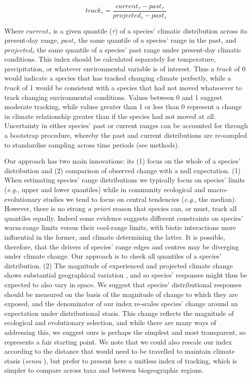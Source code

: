 \documentclass[12pt]{report}
\begin{document}
\begin{equation}
  track_\tau = \frac{current_\tau - past_\tau}{projected_\tau - past_\tau}
\end{equation}

Where $current_\tau$ is a given quantile ($\tau$) of a species'
climatic distribution across its present-day range, $past_\tau$ the
same quantile of a species' range in the past, and $projected_\tau$
the same quantile of a species' past range under present-day climatic
conditions. This index should be calculated separately for
temperature, precipitation, or whatever environmental variable is of
interest. Thus a $track$ of 0 would indicate a species that has
tracked changing climate perfectly, while a $track$ of 1 would be
consistent with a species that had not moved whatsoever to track
changing environmental conditions. Values between 0 and 1 suggest
moderate tracking, while values greater than 1 or less than 0
represent a change in climate relationship greater than if the species
had not moved at all. Uncertainty in either species' past or current
ranges can be accounted for through a bootstrap procedure, whereby the
past and current distributions are re-sampled to standardise sampling
across time periods (see methods).

Our approach has two main innovations: its (1) focus on the whole of a
species' distribution and (2) comparison of observed change with a
null expectation. (1) When estimating species' range distributions we
typically focus on species' limits\supercite{Sexton2009} (\emph{e.g.},
upper and lower quantiles) while in community ecological
\supercite{Tilman2004} and macro-evolutionary \supercite{Zanne2018}
studies we tend to focus on central tendencies (\emph{e.g.}, the
median). However, there is no strong \emph{a priori} reason that
species can, or must, track all quantiles equally. Indeed some
evidence suggests different constraints on species' warm-range limits
versus their cool-range limits, with biotic interactions more
influential in the former, and climate determining the
latter\supercite{Freeman2018}. It is possible, therefore, that the
drivers of species' range edges and centres may be diverging under
climate change. Our approach is to check all quantiles of a species'
distribution. (2) The magnitude of experienced and projected climate
change shows substantial geographical variation
\supercite{Loarie2009}, and so species' responses might thus be
expected to also vary in space. We suggest that species'
distributional responses should be measured on the basis of the
magnitude of change to which they are exposed, and the denominator of
our index re-scales species' change around an expectation under
distributional stasis.  This change reflects the magnitude of
ecological and evolutionary selection, and while there are many ways
of addressing this, we suggest ours is perhaps the simplest and most
transparent, so represents a fair starting point. We note that we
could also rescale our index according to the distance that would need
to be travelled to maintain climate stasis (\emph{sensu}
\citeauthor{Loarie2009}\supercite{Loarie2009}), but prefer to present
here a unitless index of tracking, which is simpler to compare across
taxa and between biogeographic regions.
\end{document}
